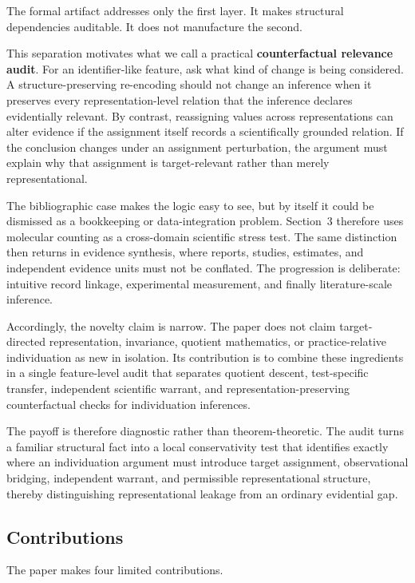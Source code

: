 \documentclass[12pt]{article}
\begin{document}
The formal artifact addresses only the first layer. It makes structural dependencies auditable. It does not manufacture the second.

This separation motivates what we call a practical \textbf{counterfactual relevance audit}. For an identifier-like feature, ask what kind of change is being considered. A structure-preserving re-encoding should not change an inference when it preserves every representation-level relation that the inference declares evidentially relevant. By contrast, reassigning values across representations can alter evidence if the assignment itself records a scientifically grounded relation. If the conclusion changes under an assignment perturbation, the argument must explain why that assignment is target-relevant rather than merely representational.

The bibliographic case makes the logic easy to see, but by itself it could be dismissed as a bookkeeping or data-integration problem. Section~3 therefore uses molecular counting as a cross-domain scientific stress test. The same distinction then returns in evidence synthesis, where reports, studies, estimates, and independent evidence units must not be conflated. The progression is deliberate: intuitive record linkage, experimental measurement, and finally literature-scale inference.

Accordingly, the novelty claim is narrow. The paper does not claim target-directed representation, invariance, quotient mathematics, or practice-relative individuation as new in isolation. Its contribution is to combine these ingredients in a single feature-level audit that separates quotient descent, test-specific transfer, independent scientific warrant, and representation-preserving counterfactual checks for individuation inferences.

The payoff is therefore diagnostic rather than theorem-theoretic. The audit turns a familiar structural fact into a local conservativity test that identifies exactly where an individuation argument must introduce target assignment, observational bridging, independent warrant, and permissible representational structure, thereby distinguishing representational leakage from an ordinary evidential gap.

\subsection{Contributions}

The paper makes four limited contributions.
\end{document}
